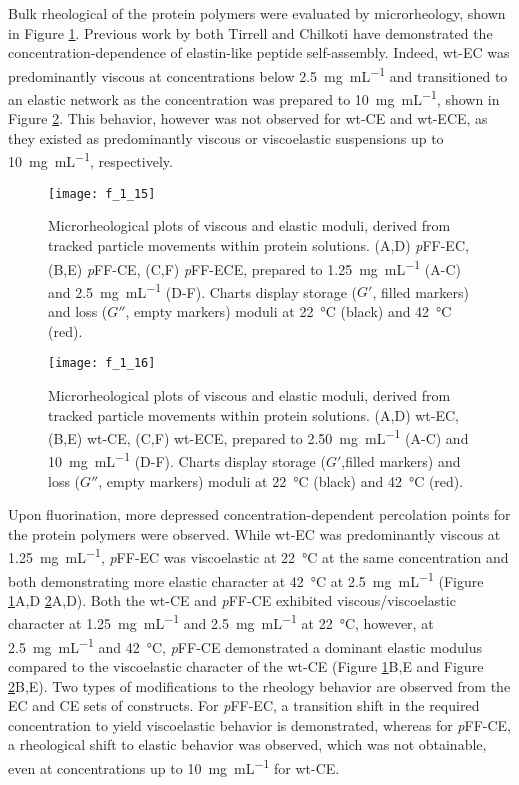 \begin{refsection}
Bulk rheological of the protein polymers were evaluated by microrheology, shown
in Figure \ref{fig:pFF_rheology}. Previous work by both Tirrell and Chilkoti
have demonstrated the concentration-dependence of elastin-like peptide
self-assembly.\cite{Meyer2004,Yamaoka2003} Indeed, wt-EC was predominantly
viscous at concentrations below \SI{2.5}{\mg\per\mL} and transitioned to an
elastic network as the concentration was prepared to \SI{10}{\mg\per\mL}, shown
in Figure \ref{fig:wt_rheology}.\cite{Haghpanah2010} This behavior, however was
not observed for wt-CE and wt-ECE, as they existed as predominantly viscous or
viscoelastic suspensions up to \SI{10}{\mg\per\mL}, respectively.
\begin{figure}[h!] \centering \texttt{[image: f\_1\_15]}
    \caption{Microrheological plots of viscous and elastic moduli, derived from
    tracked particle movements within protein solutions. (A,D) \emph{p}FF-EC, (B,E)
    \emph{p}FF-CE, (C,F) \emph{p}FF-ECE, prepared to \SI{1.25}{\mg\per\mL} (A-C) and
    \SI{2.5}{\mg\per\mL} (D-F). Charts display storage (${G'}$, filled markers) and loss
    (${G''}$, empty markers) moduli at \SI{22}{\celsius} (black) and \SI{42}{\celsius}
(red).} \label{fig:pFF_rheology} \end{figure}

\begin{figure}[h!] \centering \texttt{[image: f\_1\_16]}
    \caption{Microrheological plots of viscous and elastic moduli, derived from
    tracked particle movements within protein solutions. (A,D) wt-EC, (B,E)
    wt-CE, (C,F) wt-ECE, prepared to \SI{2.50}{\mg\per\mL} (A-C) and
    \SI{10}{\mg\per\mL} (D-F). Charts display storage (${G'}$,filled markers) and loss
    (${G''}$, empty markers) moduli at \SI{22}{\celsius} (black) and \SI{42}{\celsius}
(red).} \label{fig:wt_rheology} \end{figure}
Upon fluorination, more depressed concentration-dependent percolation points for
the protein polymers were observed. While wt-EC was predominantly viscous at
\SI{1.25}{\mg\per\mL}, \emph{p}FF-EC was viscoelastic at \SI{22}{\celsius} at the same
concentration and both demonstrating more elastic character at \SI{42}{\celsius}
at \SI{2.5}{\mg\per\mL} (Figure \ref{fig:pFF_rheology}A,D
\ref{fig:wt_rheology}A,D). Both the wt-CE and \emph{p}FF-CE exhibited
viscous/viscoelastic character at \SI{1.25}{\mg\per\mL} and \SI{2.5}{\mg\per\mL}
at \SI{22}{\celsius}, however, at \SI{2.5}{\mg\per\mL} and \SI{42}{\celsius},
\emph{p}FF-CE demonstrated a dominant elastic modulus compared to the viscoelastic
character of the wt-CE (Figure \ref{fig:pFF_rheology}B,E and Figure
\ref{fig:wt_rheology}B,E). Two types of modifications to the rheology behavior
are observed from the EC and CE sets of constructs. For \emph{p}FF-EC, a transition
shift in the required concentration to yield viscoelastic behavior is
demonstrated, whereas for \emph{p}FF-CE, a rheological shift to elastic behavior was
observed, which was not obtainable, even at concentrations up to
\SI{10}{\mg\per\mL} for wt-CE.\cite{Haghpanah2010}


\end{refsection}

